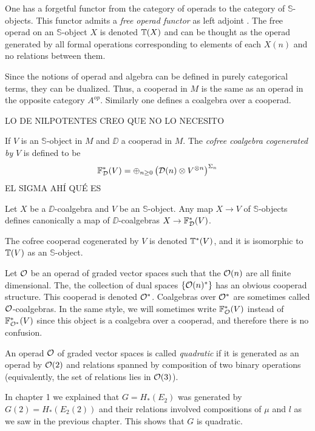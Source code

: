 \documentclass[TFM.tex]{subfiles}
\begin{document}
One has a forgetful functor from the category of operads to the category of $\mathbb{S}$-objects. This functor admits a \emph{free operad functor} as left adjoint \cite{GJHinich}. The free operad on an $\mathbb{S}$-object $X$ is denoted $\mathbb{T}(X)$ and can be thought as the operad generated by all formal operations corresponding to elements of each $X(n)$ and no relations between them.

Since the notions of operad and algebra can be defined in purely categorical terms, they can be dualized. Thus, a cooperad in $M$ is
the same as an operad in the opposite category $A^{op}$. Similarly one defines a coalgebra over a cooperad.

LO DE NILPOTENTES CREO QUE NO LO NECESITO

\begin{defi}
If $V$ is an $\mathbb{S}$-object in $M$ and $\DD$ a cooperad in $M$. The \emph{cofree coalgebra cogenerated by }$V$ is defined to be
\[
\mathbb{F}^*_{\mathcal{D}}(V)=\oplus_{n\geq 0}\left(\mathcal{D}(n)\otimes V^{\otimes n}\right)^{\Sigma_n}
\]
EL SIGMA AHÍ QUÉ ES
\end{defi}

Let $X$ be a $\DD$-coalgebra and $V$ be an $\mathbb{S}$-object. Any map $X\to V$ of $\mathbb{S}$-objects defines canonically a map of $\DD$-coalgebras $X\to \mathbb{F}_{\mathcal{D}}^*(V)$.  

The cofree cooperad cogenerated by $V$ is denoted $\mathbb{T}^*(V)$, and it is isomorphic to $\mathbb{T}(V)$ as an $\mathbb{S}$-object. 

\begin{remark}
Let ${\mathcal O}$ be an operad of graded vector spaces such that the ${\mathcal O}(n)$ are all finite dimensional. The, the collection of dual spaces $\{{\mathcal O}(n)^*\}$ has an obvious cooperad structure. This cooperad is denoted ${\mathcal O}^*$. Coalgebras over ${\mathcal O}^*$ are sometimes called ${\mathcal O}$-coalgebras. In the same style, we will sometimes write $\mathbb{F}^*_{\mathcal O}(V)$ instead of $\mathbb{F}^*_{{\mathcal O}^*}(V)$ since this object is a coalgebra over a cooperad, and therefore there is no confusion.
\end{remark}

\begin{defi}
An operad ${\mathcal O}$ of graded vector spaces is called \emph{quadratic} if it is generated as an operad by ${\mathcal O}(2)$ and relations spanned by composition of two binary operations (equivalently, the set of relations lies in ${\mathcal O}(3)$). 
\end{defi}

In chapter 1 we explained that $G=H_*(E_2)$ was generated by $G(2)=H_*(E_2(2))$ and their relations involved compositions of $\mu$ and $l$ as we saw in the previous chapter. This shows that $G$ is quadratic. %
\end{document}

